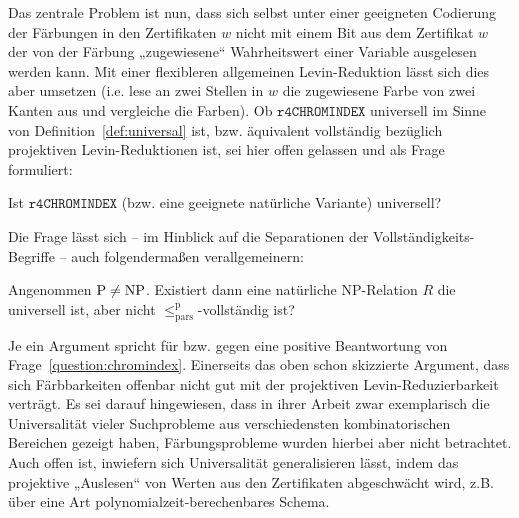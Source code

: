 Das zentrale Problem ist nun, dass sich selbst unter einer geeigneten Codierung der Färbungen in den Zertifikaten $w$ nicht mit einem Bit aus dem Zertifikat $w$ der von der Färbung „zugewiesene“ Wahrheitswert einer Variable ausgelesen werden kann. Mit einer flexibleren allgemeinen Levin-Reduktion lässt sich dies aber umsetzen (i.e. lese an zwei Stellen in $w$ die zugewiesene Farbe von zwei Kanten aus und vergleiche die Farben). Ob $\mathtt{r4CHROMINDEX}$ universell im Sinne von Definition~\ref{def:universal} ist, bzw. äquivalent vollständig bezüglich projektiven Levin-Reduktionen ist, sei hier offen gelassen und als Frage formuliert:
\begin{question}\label{question:chromindex}
    Ist $\mathtt{r4CHROMINDEX}$ (bzw. eine geeignete natürliche Variante) universell?
\end{question}
Die Frage lässt sich – im Hinblick auf die Separationen der Vollständigkeits-Begriffe – auch  folgendermaßen verallgemeinern:
\begin{question}
    Angenommen $\mathrm{P}\neq\mathrm{NP}$.
    Existiert dann eine natürliche NP-Relation $R$ die universell ist, aber nicht $\leq_\mathrm{pars}^\mathrm p$-vollständig ist?
\end{question}

Je ein Argument spricht für bzw. gegen eine positive Beantwortung von Frage~\ref{question:chromindex}.
Einerseits das oben schon skizzierte Argument, dass sich Färbbarkeiten offenbar nicht gut mit der projektiven Levin-Reduzierbarkeit verträgt.  Es sei darauf hingewiesen, dass \textcite{agrawal_universal_1992} in ihrer Arbeit zwar exemplarisch die Universalität vieler Suchprobleme aus verschiedensten kombinatorischen Bereichen gezeigt haben, Färbungsprobleme wurden hierbei aber nicht betrachtet. 
Auch offen ist, inwiefern sich Universalität generalisieren lässt, indem das projektive „Auslesen“ von Werten aus den Zertifikaten abgeschwächt wird, z.B. über eine Art polynomialzeit-berechenbares Schema.


